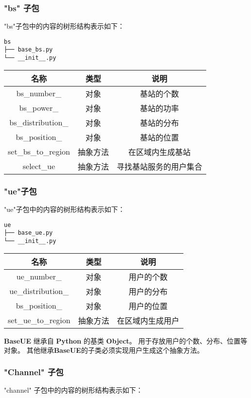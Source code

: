 \documentclass[11pt]{article}
\begin{document}
    \subsubsection{"bs" 子包}\label{bs-ux5b50ux5305}

"bs"子包中的内容的树形结构表示如下：

\begin{verbatim}
bs
├── base_bs.py
└── __init__.py
\end{verbatim}

\begin{longtable}[c]{@{}ccc@{}}
\toprule
名称 & 类型 & 说明\tabularnewline
\midrule
\endhead
bs\_number\_ & 对象 & 基站的个数\tabularnewline
bs\_power\_ & 对象 & 基站的功率\tabularnewline
bs\_distribution\_ & 对象 & 基站的分布\tabularnewline
bs\_position\_ & 对象 & 基站的位置\tabularnewline
set\_bs\_to\_region & 抽象方法 & 在区域内生成基站\tabularnewline
select\_ue & 抽象方法 & 寻找基站服务的用户集合\tabularnewline
\bottomrule
\end{longtable}

    \subsubsection{"ue"子包}\label{ueux5b50ux5305}

"ue"子包中的内容的树形结构表示如下：

\begin{verbatim}
ue
├── base_ue.py
└── __init__.py
\end{verbatim}

\begin{longtable}[c]{@{}ccc@{}}
\toprule
名称 & 类型 & 说明\tabularnewline
\midrule
\endhead
ue\_number\_ & 对象 & 用户的个数\tabularnewline
ue\_distribution\_ & 对象 & 用户的分布\tabularnewline
bs\_position\_ & 对象 & 用户的位置\tabularnewline
set\_ue\_to\_region & 抽象方法 & 在区域内生成用户\tabularnewline
\bottomrule
\end{longtable}

\textbf{BaseUE} 继承自 \textbf{Python} 的基类 \textbf{Object}。
用于存放用户的个数、分布、位置等对象。
其他继承\textbf{BaseUE}的子类必须实现用户生成这个抽象方法。

    \subsubsection{"Channel" 子包}\label{channel-ux5b50ux5305}

"channel" 子包中的内容的树形结构表示如下：
\end{document}
